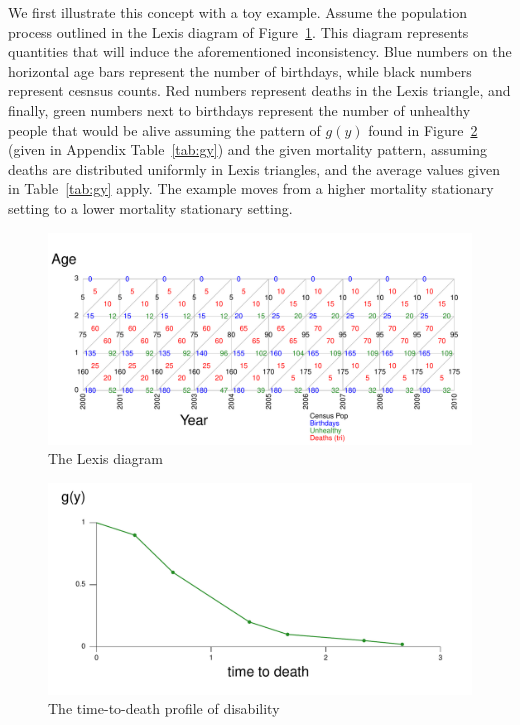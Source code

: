 \documentclass[11pt,oneside,a4paper]{article} %
\begin{document}
We first illustrate this concept with a toy example. Assume the population
process outlined in the Lexis diagram of Figure~\ref{fig:Fig_DiagramLexis}. This
diagram represents quantities that will induce the aforementioned inconsistency.
Blue numbers on the horizontal age bars represent the number of birthdays, while
black numbers represent cesnsus counts. Red numbers represent deaths in the
Lexis triangle, and finally, green numbers next to birthdays represent the
number of unhealthy people that would be alive assuming the pattern of $g(y)$
found in Figure~\ref{fig:Fig_TTDgy} (given in Appendix Table~\ref{tab:gy}) and
the given mortality pattern, assuming deaths are distributed uniformly in Lexis
triangles, and the average values given in Table~\ref{tab:gy} apply. The example
moves from a higher mortality stationary setting to a lower mortality stationary
setting.

\begin{figure}
\begin{adjustwidth}{-1.5cm}{}
	\centering
	\includegraphics[scale=.6]{Figures/DiagramLexis.pdf}
	\caption{The Lexis diagram}
	\label{fig:Fig_DiagramLexis}
\end{adjustwidth}
\end{figure}

\begin{figure}
\begin{adjustwidth}{-1.5cm}{}
	\centering
	\includegraphics[scale=.6]{Figures/TTDgy.pdf}
	\caption{The time-to-death profile of disability}
	\label{fig:Fig_TTDgy}
\end{adjustwidth}
\end{figure}
\end{document}

